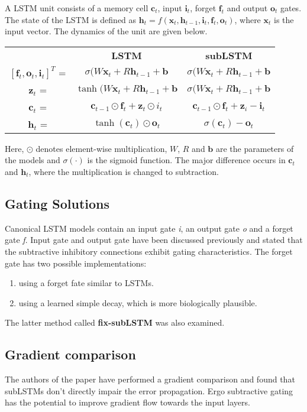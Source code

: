 A LSTM unit consists of a memory cell $\textbf{c}_t$, input $\textbf{i}_t$, forget $\textbf{f}_t$ and output $\textbf{o}_t$ gates. The state of the LSTM is defined as $\textbf{h}_t = f(\textbf{x}_t, \textbf{h}_{t-1}, \textbf{i}_t, \textbf{f}_t, \textbf{o}_t)$, where $\textbf{x}_t$ is the input vector. The dynamics of the unit are given below.
\begin{table}[h!]
\centering
\def\arraystretch{1.5}
\begin{tabular}{c|c|c}
        & \textbf{LSTM}               & \textbf{subLSTM}             \\
$[\textbf{f}_t, \textbf{o}_t, \textbf{i}_t]^T$ = & $\sigma(W\textbf{x}_t + R\textbf{h}_{t-1} + \textbf{b}$ & $\sigma(W\textbf{x}_t + R\textbf{h}_{t-1} + \textbf{b}$\\
$\textbf{z}_t$ = & $\tanh(W\textbf{x}_t + R\textbf{h}_{t-1} + \textbf{b}$ & $\sigma(W\textbf{x}_t + R\textbf{h}_{t-1} + \textbf{b}$\\
$\textbf{c}_t$ = & $\textbf{c}_{t-1} \odot \textbf{f}_t + \textbf{z}_t \odot i_t$ & $\textbf{c}_{t-1} \odot \textbf{f}_t + \textbf{z}_i - \textbf{i}_t$  \\
$\textbf{h}_t$ = & $\tanh(\textbf{c}_t) \odot \textbf{o}_t$             & $\sigma(\textbf{c}_t) - \textbf{o}_t$          
\end{tabular}
\end{table}
Here, $\odot$ denotes element-wise multiplication, $W$, $R$ and $\textbf{b}$ are the parameters of the models and $\sigma(\cdot)$ is the sigmoid function. The major difference occurs in $\textbf{c}_t$ and $\textbf{h}_t$, where the multiplication is changed to subtraction.


\subsection{Gating Solutions}
Canonical LSTM models contain an input gate \textit{i}, an output gate \textit{o} and a forget gate \textit{f}. Input gate and output gate have been discussed previously and stated that the subtractive inhibitory connections exhibit gating characteristics. The forget gate has two possible implementations:
\begin{enumerate}
    \item using a forget fate similar to LSTMs.
    \item using a learned simple decay, which is more biologically plausible.
\end{enumerate}
The latter method called \textbf{fix-subLSTM} was also examined.

\subsection{Gradient comparison}
The authors of the paper have performed a gradient comparison and found that subLSTMs don't directly impair the error propagation. Ergo subtractive gating has the potential to improve gradient flow towards the input layers.